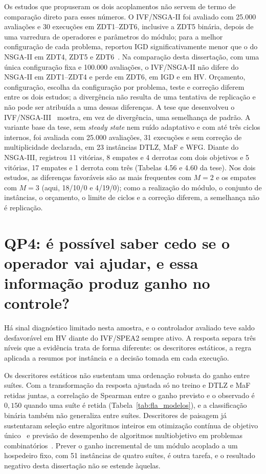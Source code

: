 Os estudos que propuseram os dois acoplamentos não servem de termo de comparação direto para esses números. O IVF/NSGA-II foi avaliado com 25.000 avaliações e 30 execuções em ZDT1--ZDT6, inclusive a ZDT5 binária, depois de uma varredura de operadores e parâmetros do módulo; para a melhor configuração de cada problema, reportou IGD significativamente menor que o do NSGA-II em ZDT4, ZDT5 e ZDT6~\cite{sampaio2017ivf}. Na comparação desta dissertação, com uma única configuração fixa e 100.000 avaliações, o IVF/NSGA-II não difere do NSGA-II em ZDT1--ZDT4 e perde em ZDT6, em IGD e em HV. Orçamento, configuração, escolha da configuração por problema, teste e correção diferem entre os dois estudos; a divergência não resulta de uma tentativa de replicação e não pode ser atribuída a uma dessas diferenças. A tese que desenvolveu o IVF/NSGA-III~\cite{Sampaio2024} mostra, em vez de divergência, uma semelhança de padrão. A variante base da tese, sem \textit{steady state} nem ruído adaptativo e com até três ciclos internos, foi avaliada com 25.000 avaliações, 31 execuções e sem correção de multiplicidade declarada, em 23 instâncias DTLZ, MaF e WFG. Diante do NSGA-III, registrou 11 vitórias, 8 empates e 4 derrotas com dois objetivos e 5 vitórias, 17 empates e 1 derrota com três (Tabelas 4.56 e 4.60 da tese). Nos dois estudos, as diferenças favoráveis são as mais frequentes com $M = 2$ e os empates com $M = 3$ (aqui, 18/10/0 e 4/19/0); como a realização do módulo, o conjunto de instâncias, o orçamento, o limite de ciclos e a correção diferem, a semelhança não é replicação.

\section{QP4: é possível saber cedo se o operador vai ajudar, e essa informação produz ganho no controle?}
\label{sec:resposta_qp4}

Há sinal diagnóstico limitado nesta amostra, e o controlador avaliado teve saldo desfavorável em HV diante do IVF/SPEA2 sempre ativo. A resposta separa três níveis que a evidência trata de forma diferente: os descritores estáticos, a regra aplicada a resumos por instância e a decisão tomada em cada execução.

Os descritores estáticos não sustentam uma ordenação robusta do ganho entre suítes. Com a transformação da resposta ajustada só no treino e DTLZ e MaF retidas juntas, a correlação de Spearman entre o ganho previsto e o observado é $0{,}150$ quando uma suíte é retida (Tabela~\ref{tab:fla_modelos}), e a classificação binária também não generaliza entre suítes. Descritores de paisagem já sustentaram seleção entre algoritmos inteiros em otimização contínua de objetivo único~\cite{kerschke2019automated} e previsão de desempenho de algoritmos multiobjetivo em problemas combinatórios~\cite{liefooghe2018landscape}. Prever o ganho incremental de um módulo acoplado a um hospedeiro fixo, com 51 instâncias de quatro suítes, é outra tarefa, e o resultado negativo desta dissertação não se estende àquelas.


